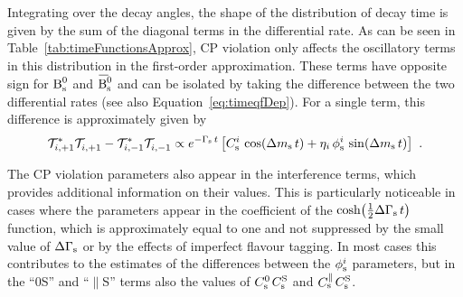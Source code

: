 \begin{table}[htbp]
\begin{tabular}{cl}
                           (\Cspar+\CsS)\cperpS - (\phisS-\phispar)\sperpS$  \\
      &  $\qquad\qquad\quad    - 
                                 \cdot{}\DGs\,t$ \\
      &  $\qquad\qquad\quad\   + \cDms$  \\
      &  $\qquad\qquad\quad\ \ + \sDms
                         \Big]$  \\
    $\perp$S
      &  $-\CSP\magperpAv\magSAv \Big[
                           \big[ \tfrac{1}{2}(\phisS-\phisperp)\cperpS - \sperpS \big] (1 + \DGs\,t)$ \\
      &  $\qquad\qquad\quad\   - \cDms$  \\
      &  $\qquad\qquad\quad\ \ - \sDms
                         \Big]$  \\
    \hline
  \end{tabular}
\end{table}

Integrating over the decay angles, the shape of the distribution of decay time is given by the sum of the diagonal terms in the
differential rate. As can be seen in Table~\ref{tab:timeFunctionsApprox}, CP violation only affects the oscillatory terms in this
distribution in the first-order approximation. These terms have opposite sign for $\text{B}_\text{s}^\text{0}$ and $\Bsbar$ and can be isolated by taking the
difference between the two differential rates (see also Equation~\ref{eq:timeqfDep}). For a single term, this difference is approximately
given by
\begin{equation}
  \label{eq:timeOscill}
  \timeAmp[i,+1]^*\timeAmp[i,+1]^{\phantom{*}} - \timeAmp[i,-1]^*\timeAmp[i,-1]^{\phantom{*}}
    \propto \eGst\left[ \Csi\,\cDms + \eta_i\,\phisi\,\sDms \right] \ .
\end{equation}

The CP violation parameters also appear in the interference terms, which provides additional information on their values. This is
particularly noticeable in cases where the parameters appear in the coefficient of the $\cosh\!\left(\tfrac{1}{2}\Delta\Gamma_\text{s}\, t\right)$ function, which is approximately equal to
one and not suppressed by the small value of $\Delta\Gamma_\text{s}$ or by the effects of imperfect flavour tagging. In most cases this contributes to the
estimates of the differences between the $\phi_\text{s}^{i}$ parameters, but in the ``0S'' and ``$\parallel$S'' terms also the values of
$C_\text{s}^{\text{0}}$\textplus$C_\text{s}^{\text{S}}$ and $C_\text{s}^{\parallel}$\textplus$C_\text{s}^{\text{S}}$.

